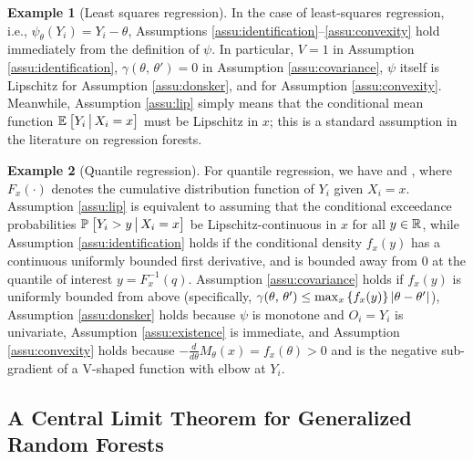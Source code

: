 \documentclass[aos]{imsart}
\theoremstyle{plain}
\theoremstyle{definition}
\newtheorem{exam}{Example}
\theoremstyle{remark}
\begin{document}
\begin{CJK}{UTF8}{gbsn}
\begin{exam}[Least squares regression]
\label{exam:regression}
In the case of least-squares regression, i.e., $\psi_{\theta}(Y_i) = Y_i - \theta$,
Assumptions \ref{assu:identification}--\ref{assu:convexity} hold immediately from the
definition of $\psi$. In particular, $V = 1$ in Assumption \ref{assu:identification},
$\gamma(\theta, \, \theta') = 0$ in Assumption \ref{assu:covariance},
$\psi$ itself is Lipschitz for Assumption \ref{assu:donsker}, and 
 for Assumption \ref{assu:convexity}.
Meanwhile, Assumption \ref{assu:lip} simply means that
the conditional mean function $\mathbb{E}_{}\left[Y_i \,\big|\, X_i = x\right]$ must be Lipschitz in $x$;
this is a standard assumption in the literature on regression forests.
\end{exam}

\begin{exam}[Quantile regression]
For quantile regression, we have
and ,
where $F_x(\cdot)$ denotes the cumulative distribution function of $Y_i$ given $X_i = x$.
Assumption \ref{assu:lip} is equivalent to assuming that the
conditional exceedance probabilities $\mathbb{P}_{}\left[Y_i > y \,\big|\, X_i = x\right]$
be Lipschitz-continuous in $x$ for all $y \in \mathbb{R}$, while Assumption \ref{assu:identification}
holds if the conditional density $f_x(y)$ has a continuous uniformly bounded first derivative,
and is bounded away from 0 at the quantile of interest $y = F^{-1}_x(q)$.
Assumption \ref{assu:covariance} holds if $f_x(y)$ is uniformly bounded from above
(specifically, $\gamma(\theta, \, \theta') \leq \max_x \left\{f_x(y)\right\} \left\lvert\theta - \theta'\right\rvert$),
Assumption \ref{assu:donsker} holds because $\psi$ is monotone and $O_i = Y_i$ is univariate,
Assumption \ref{assu:existence} is immediate, and Assumption \ref{assu:convexity} holds
because $ - \frac{d}{d\theta} M_\theta(x) = f_x(\theta) > 0$ and 
is the negative sub-gradient of a V-shaped function with elbow at $Y_i$.
\end{exam}

\subsection{A Central Limit Theorem for Generalized Random Forests}
\label{sec:gauss}


\end{CJK}
\end{document}
